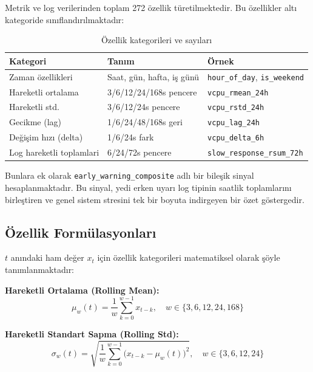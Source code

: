 Metrik ve log verilerinden toplam 272 özellik türetilmektedir.
Bu özellikler altı kategoride sınıflandırılmaktadır:

\begin{table}[htbp]
    \centering
    \caption{Özellik kategorileri ve sayıları}
    \label{tab:ozellikler}
    \begin{tabular}{lll}
        \textbf{Kategori} & \textbf{Tanım} & \textbf{Örnek} \\
        \hline
        Zaman özellikleri      & Saat, gün, hafta, iş günü & \texttt{hour\_of\_day}, \texttt{is\_weekend} \\
        Hareketli ortalama     & 3/6/12/24/168s pencere & \texttt{vcpu\_rmean\_24h} \\
        Hareketli std.         & 3/6/12/24s pencere     & \texttt{vcpu\_rstd\_24h} \\
        Gecikme (lag)          & 1/6/24/48/168s geri    & \texttt{vcpu\_lag\_24h} \\
        Değişim hızı (delta)   & 1/6/24s fark           & \texttt{vcpu\_delta\_6h} \\
        Log hareketli toplamlari & 6/24/72s pencere    & \texttt{slow\_response\_rsum\_72h} \\
    \end{tabular}
\end{table}

Bunlara ek olarak \texttt{early\_warning\_composite} adlı bir bileşik sinyal hesaplanmaktadır.
Bu sinyal, yedi erken uyarı log tipinin saatlik toplamlarını birleştiren ve genel sistem stresini tek bir boyuta indirgeyen bir özet göstergedir.

\subsection{Özellik Formülasyonları}

$t$ anındaki ham değer $x_t$ için özellik kategorileri matematiksel olarak şöyle tanımlanmaktadır:

\textbf{Hareketli Ortalama (Rolling Mean):}
\begin{equation}
    \mu_w(t) = \frac{1}{w} \sum_{k=0}^{w-1} x_{t-k}, \quad w \in \{3, 6, 12, 24, 168\}
    \label{eq:rmean}
\end{equation}

\textbf{Hareketli Standart Sapma (Rolling Std):}
\begin{equation}
    \sigma_w(t) = \sqrt{\frac{1}{w} \sum_{k=0}^{w-1} \bigl(x_{t-k} - \mu_w(t)\bigr)^2}, \quad w \in \{3, 6, 12, 24\}
    \label{eq:rstd}
\end{equation}


